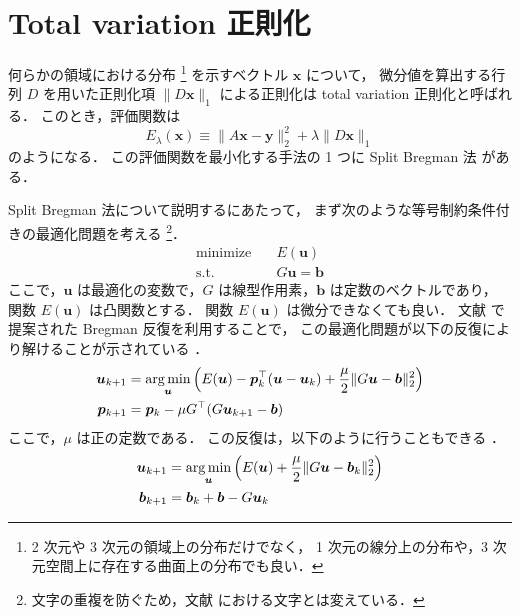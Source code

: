 %

\section{Total variation 正則化}

何らかの領域における分布
\footnote{2 次元や 3 次元の領域上の分布だけでなく，%
    1 次元の線分上の分布や，3 次元空間上に存在する曲面上の分布でも良い．}
を示すベクトル $\bm{x}$ について，
微分値を算出する行列 $D$ を用いた正則化項 $\|D \bm{x}\|_1$ による正則化は
total variation 正則化と呼ばれる．
このとき，評価関数は
\begin{equation}
    E_{\lambda}(\bm{x}) \equiv \|A \bm{x} - \bm{y}\|_2^2 + \lambda \|D \bm{x}\|_1
\end{equation}
のようになる．
この評価関数を最小化する手法の 1 つに
Split Bregman 法 \cite{Goldstein2009}
がある．

Split Bregman 法について説明するにあたって，
まず次のような等号制約条件付きの最適化問題を考える
\cite{Goldstein2009}
\footnote{文字の重複を防ぐため，文献 \cite{Goldstein2009} における文字とは変えている．}．
\begin{align}
    \text{minimize} \hspace{1em} & E(\bm{u})         \\
    \text{s.t.} \hspace{1em}     & G \bm{u} = \bm{b}
\end{align}
ここで，$\bm{u}$ は最適化の変数で，$G$ は線型作用素，$\bm{b}$ は定数のベクトルであり，
関数 $E(\bm{u})$ は凸関数とする．
関数 $E(\bm{u})$ は微分できなくても良い．
文献 \cite{Bregman1967} で提案された Bregman 反復を利用することで，
この最適化問題が以下の反復により解けることが示されている
\cite{Goldstein2009}．
\begin{align}
    \bm{u}_{k+1} & = \operatorname*{arg \thinspace min}_{\bm{u}} \left( E(\bm{u}) - \bm{p}_k^\top (\bm{u} - \bm{u}_k)
    + \frac{\mu}{2} \|G \bm{u} - \bm{b}\|_2^2 \right)
    \\
    \bm{p}_{k+1} & = \bm{p}_k - \mu G^\top (G \bm{u}_{k+1} - \bm{b})
\end{align}
ここで，$\mu$ は正の定数である．
この反復は，以下のように行うこともできる
\cite{Goldstein2009}．
\begin{align}
    \bm{u}_{k+1} & = \operatorname*{arg \thinspace min}_{\bm{u}} \left( E(\bm{u}) + \frac{\mu}{2} \|G \bm{u} - \bm{b}_k\|_2^2 \right)
    \\
    \bm{b}_{k+1} & = \bm{b}_k + \bm{b} - G \bm{u}_k
\end{align}

